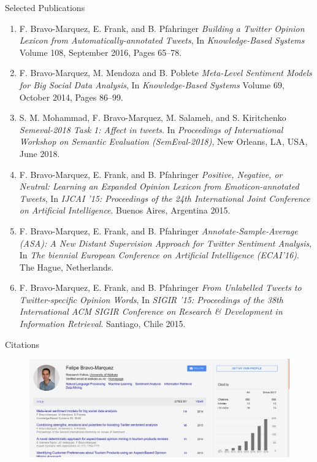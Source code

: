 \documentclass[handout]{beamer}
\begin{document}
\begin{frame}{Selected Publications}
\begin{scriptsize}
\begin{enumerate}
\item F. Bravo-Marquez, E. Frank, and B. Pfahringer \textit{Building a Twitter Opinion Lexicon from Automatically-annotated Tweets}, In \textit{Knowledge-Based Systems}  Volume 108, September 2016, Pages 65–78.
\item F. Bravo-Marquez, M. Mendoza and B. Poblete \textit{Meta-Level Sentiment Models for Big Social Data Analysis}, In \textit{Knowledge-Based Systems} Volume 69, October 2014, Pages 86–99. 
\item S. M. Mohammad, F. Bravo-Marquez, M. Salameh, and S. Kiritchenko  \textit{Semeval-2018 Task 1: Affect in tweets}. In \textit{Proceedings of International Workshop on Semantic Evaluation (SemEval-2018)}, New Orleans, LA, USA, June 2018. 
\item F. Bravo-Marquez, E. Frank, and B. Pfahringer \textit{Positive, Negative, or Neutral: Learning an Expanded Opinion Lexicon from Emoticon-annotated Tweets}, In \textit{IJCAI '15: Proceedings of the 24th International Joint Conference on Artificial Intelligence}. Buenos Aires, Argentina 2015.
\item F. Bravo-Marquez, E. Frank, and B. Pfahringer \textit{Annotate-Sample-Average (ASA): A New Distant Supervision Approach for Twitter Sentiment Analysis}, In \textit{The biennial European Conference  on Artificial Intelligence (ECAI'16)}. The Hague, Netherlands.
\item F. Bravo-Marquez, E. Frank, and B. Pfahringer \textit{From Unlabelled Tweets to Twitter-specific Opinion Words}, In \textit{SIGIR '15: Proceedings of the 38th International ACM SIGIR Conference on Research \& Development in Information Retrieval}. Santiago, Chile 2015.  
\end{enumerate} 
\end{scriptsize}
\end{frame}




\begin{frame}{Citations}
\begin{figure}[htb]
	\centering
	 \includegraphics[scale=0.35]{pics/gscholar.png}
\end{figure}
\end{frame}
\end{document}
